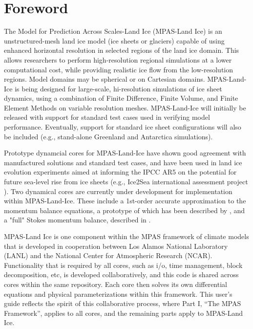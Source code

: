 \chapter*{Foreword}
\label{chap:foreword}

The Model for Prediction Across Scales-Land Ice (MPAS-Land Ice) is an unstructured-mesh land ice model (ice sheets or glaciers) capable of using enhanced horizontal resolution in selected regions of the land ice domain.  This allows researchers to perform high-resolution regional simulations at a lower computational cost, while providing realistic ice flow from the low-resolution regions. Model domains may be spherical or on Cartesian domains.  MPAS-Land-Ice is being designed for large-scale, hi-resolution simulations of ice sheet dynamics, using a combination of Finite Difference, Finite Volume, and Finite Element Methods on variable resolution meshes.  MPAS-Land-Ice will initially be released with support for standard test cases used in verifying model performance. Eventually, support for standard ice sheet configurations will also be included (e.g., stand-alone Greenland and Antarctica simulations).

Prototype dynamcial cores for MPAS-Land-Ice have shown good agreement with manufactured solutions and standard test cases, and have been used in land ice evolution experiments aimed at informing the IPCC AR5 on the potential for future sea-level rise from ice sheets (e.g., Ice2Sea international assessment project \citep{Shannon2013, Edwards2013b}).  Two dynamical cores are currently under development for implementation within MPAS-Land-Ice. These include a 1st-order accurate approximation to the momentum balance equations, a prototype of which has been described by \citet{Perego2012}, and a "full" Stokes momentum balance, described in \citet{Leng2012}. 

MPAS-Land Ice is one component within the MPAS framework of climate models that is developed in cooperation between Los Alamos National Laboratory (LANL) and the National Center for Atmospheric Research (NCAR).  Functionality that is required by all cores, such as i/o, time management, block decomposition, etc, is developed collaboratively, and this code is shared across cores within the same repository.  Each core then solves its own differential equations and physical parameterizations within this framework.  This user's guide reflects the spirit of this collaborative process, where Part I, ``The MPAS Framework'', applies to all cores, and the remaining parts apply to MPAS-Land Ice.

